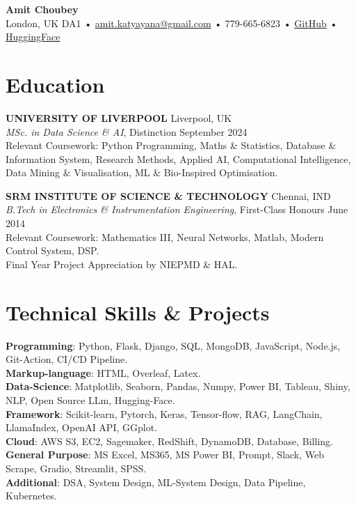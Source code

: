 \documentclass[a4paper,9pt]{article} %
\begin{document}
\begin{center}
    {\LARGE \textbf{Amit Choubey}} \\
    London, UK  DA1 • \href{mailto:amit.katyayana@gmail.com}{amit.katyayana@gmail.com} • 779-665-6823 • \href{https://github.com/amit-chaubey}{GitHub} • \href{ https://huggingface.co/sweatSmile}{HuggingFace}
\end{center}

\vspace{0.1cm} %

\section*{Education}

\textbf{UNIVERSITY OF LIVERPOOL} \hfill Liverpool, UK \\
\textit{MSc. in Data Science \& AI}, Distinction \hfill September 2024 \\
Relevant Coursework: Python Programming, Maths \& Statistics, Database \& Information System, Research Methods, Applied AI, Computational Intelligence, Data Mining \& Visualisation, ML \& Bio-Inspired Optimisation.\\

\vspace{0.1cm} %

\textbf{SRM INSTITUTE OF SCIENCE \& TECHNOLOGY} \hfill Chennai, IND \\
\textit{B.Tech in Electronics \& Instrumentation Engineering}, First-Class Honours \hfill June 2014 \\
Relevant Coursework:  Mathematics III, Neural Networks, Matlab, Modern Control System, DSP. \\
Final Year Project Appreciation by NIEPMD \& HAL.

\section*{Technical Skills \& Projects}

\textbf{Programming}: Python, Flask, Django, SQL, MongoDB, JavaScript, Node.js, Git-Action, CI/CD Pipeline.\\
\textbf{Markup-language}: HTML, Overleaf, Latex.\\
\textbf{Data-Science}: Matplotlib, Seaborn, Pandas, Numpy,  Power BI, Tableau, Shiny, NLP, Open Source LLm, Hugging-Face.\\ 
\textbf{Framework}: Scikit-learn, Pytorch, Keras, Tensor-flow, RAG, LangChain, LlamaIndex, OpenAI API, GGplot.\\
\textbf{Cloud}: AWS S3, EC2, Sagemaker, RedShift, DynamoDB, Database, Billing.\\
\textbf{General Purpose}: MS Excel, MS365, MS Power BI, Prompt, Slack, Web Scrape, Gradio, Streamlit, SPSS.\\
\textbf{Additional}: DSA, System Design, ML-System Design, Data Pipeline, Kubernetes.
\vspace{0.2cm}
\end{document}
